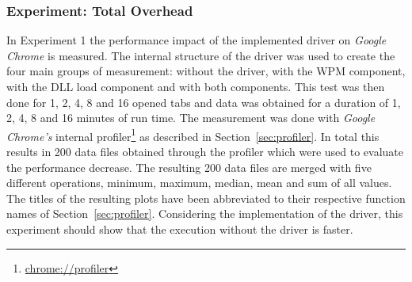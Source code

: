 \subsubsection{Experiment: Total Overhead}
In Experiment 1 the performance impact of the implemented driver on \emph{Google Chrome} is measured. The internal structure of the driver was used to create the four main groups of measurement: without the driver, with the \gls{WPM} component, with the \gls{DLL} load component and with both components. This test was then done for 1, 2, 4, 8 and 16 opened tabs and data was obtained for a duration of 1, 2, 4, 8 and 16 minutes of run time. The measurement was done with \emph{Google Chrome's} internal profiler\footnote{\url{chrome://profiler}} as described in Section~\ref{sec:profiler}. In total this results in 200 data files obtained through the profiler which were used to evaluate the performance decrease. The resulting 200 data files are merged with five different operations, minimum, maximum, median, mean and sum of all values. The titles of the resulting plots have been abbreviated to their respective function names of Section~\ref{sec:profiler}. Considering the implementation of the driver, this experiment should show that the execution without the driver is faster.
